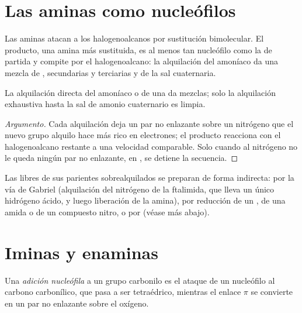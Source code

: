 \section{Las aminas como nucleófilos}

Las aminas atacan a los halogenoalcanos por sustitución bimolecular. El producto, una amina más
sustituida, es al menos tan nucleófilo como la de partida y compite por el halogenoalcano:
la alquilación del amoníaco da una mezcla de , secundarias y terciarias y de la
sal cuaternaria.

\begin{proposition}[Polialquilación]\label{prop:b2:amines:polyalkylation}
La alquilación directa del amoníaco o de una  da mezclas; solo la alquilación exhaustiva
hasta la sal de amonio cuaternario es limpia.
\end{proposition}

\begin{proof}[Argumento]
Cada alquilación deja un par no enlazante sobre un nitrógeno que el nuevo grupo alquilo hace más rico
en electrones; el producto reacciona con el halogenoalcano restante a una velocidad comparable. Solo cuando
al nitrógeno no le queda ningún par no enlazante, en , se detiene la secuencia.
\end{proof}

Las  libres de sus parientes sobrealquilados se preparan de forma indirecta: por la vía de
Gabriel (alquilación del nitrógeno de la ftalimida, que lleva un único hidrógeno ácido, y luego
liberación de la amina), por reducción de un , de una amida o de un compuesto nitro, o por
 (véase más abajo).

\section{Iminas y enaminas}

\begin{definition}\label{def:b2:amines:nucleophilic-addition}
Una \emph{adición nucleófila} a un grupo carbonilo es el ataque de
un nucleófilo al carbono carbonílico, que pasa a ser tetraédrico, mientras el enlace $\pi$  se convierte en
un par no enlazante sobre el oxígeno.
\end{definition}

